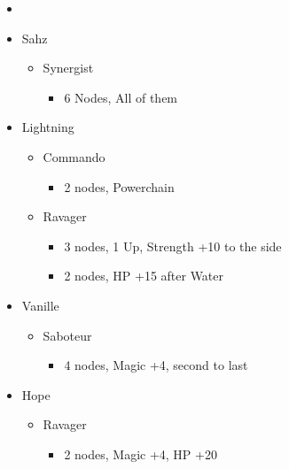 \documentclass{report}
\begin{document}
\begin{menu}
\begin{itemize}
    \paradigm
    \begin{itemize}
        \item {}%
{\paradigmline{\rav}{\com}{\rav}}%
{\paradigmline{\syn}{\com}{\sab}}%
{\paradigmline{\rav}{\com}{(\rav)}}%
{\paradigmline{\textit{\rav}}{\textit{\rav}}{\textit{\sab}}}%
{\paradigmline{\rav}{[\rav]}{\rav}}%
{\paradigmline{\rav}{[\rav]}{\rav}}
    \end{itemize}
    \crystarium
    \begin{itemize}
        \item Sahz
        \begin{itemize}
            \item Synergist
            \begin{itemize}
                \item 6 Nodes, All of them
            \end{itemize}
        \end{itemize}
        \item Lightning
        \begin{itemize}
            \item Commando
            \begin{itemize}
                \item 2 nodes, Powerchain
            \end{itemize}
            \item Ravager
            \begin{itemize}
                \item 3 nodes, 1 Up, Strength +10 to the side
                \item 2 nodes, HP +15 after Water
            \end{itemize}
        \end{itemize}
        \item Vanille
        \begin{itemize}
            \item Saboteur
            \begin{itemize}
                \item 4 nodes, Magic +4, second to last
            \end{itemize}
        \end{itemize}
        \item Hope
        \begin{itemize}
            \item Ravager
            \begin{itemize}
                \item 2 nodes, Magic +4, HP +20
            \end{itemize}
        \end{itemize}
    \end{itemize}
\end{itemize}
\end{menu}
\end{document}
